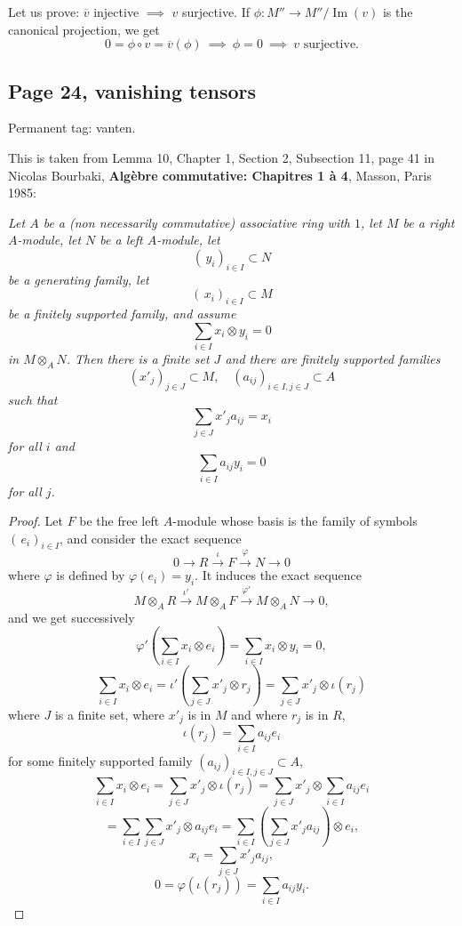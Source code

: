 \documentclass[parskip=half,fontsize=12pt]{scrartcl}%
\newcommand{\oo}{\operatorname}\newcommand{\ooo}{\operatorname*}
\begin{document}
Let us prove: $\overline v$ injective $\implies$ $v$ surjective. If $\phi:M''\to M''/\oo{Im}(v)$ is the canonical projection, we get 
$$
0=\phi\circ v=\overline v(\phi)\ \implies\ \phi=0\ \implies\ v\text{ surjective.}
$$

\subsection{Page 24, vanishing tensors}\label{vt}%

Permanent tag: vanten.

This is taken from Lemma 10, Chapter 1, Section 2, Subsection 11, page 41 in Nicolas Bourbaki, \textbf{Algèbre commutative: Chapitres 1 à 4}, Masson, Paris 1985:

\emph{Let $A$ be a (non necessarily commutative) associative ring with $1$, let $M$ be a right $A$-module, let $N$ be a left $A$-module, let 
$$
(\,y_i)_{i\in I}\subset N
$$ 
be a generating family, let 
$$
(\,x_i)_{i\in I}\subset M
$$ 
be a finitely supported family, and assume 
$$
\sum_{i\in I}x_i\otimes y_i=0
$$ 
in $M\otimes_AN$. Then there is a finite set $J$ and there are finitely supported families 
$$
(x'_j)_{j\in J}\subset M,\quad(a_{ij})_{i\in I,j\in J}\subset A
$$ 
such that 
$$
\sum_{j\in J} x'_ja_{ij}=x_i
$$ 
for all $i$ and 
$$
\sum_{i\in I}a_{ij}y_i=0
$$ 
for all $j$.}

\begin{proof} 
Let $F$ be the free left $A$-module whose basis is the family of symbols $(\,e_i)_{i\in I}$, and consider the exact sequence 
$$
0\to R\xrightarrow\iota F\xrightarrow\varphi N\to 0
$$ 
where $\varphi$ is defined by $\varphi(e_i)=y_i$. It induces the exact sequence 
$$
M\otimes_AR\xrightarrow{\iota'}M\otimes_AF\xrightarrow{\varphi'}M\otimes_AN\to 0,
$$ 
and we get successively
$$
\varphi'\left(\sum_{i\in I}x_i\otimes e_i\right)=\sum_{i\in I}x_i\otimes y_i=0,
$$ 
$$
\sum_{i\in I}x_i\otimes e_i=\iota'\left(\sum_{j\in J}x'_j\otimes r_j\right)=\sum_{j\in J}x'_j\otimes\iota(r_j)
$$ 
where $J$ is a finite set, where $x'_j$ is in $M$ and where $r_j$ is in $R$, 
$$
\iota(r_j)=\sum_{i\in I}a_{ij}e_i
$$ 
for some finitely supported family $(a_{ij})_{i\in I,j\in J}\subset A$, 
$$
\sum_{i\in I}x_i\otimes e_i=\sum_{j\in J}x'_j\otimes\iota(r_j)=\sum_{j\in J} x'_j\otimes\sum_{i\in I}a_{ij}e_i
$$
$$
=\sum_{i\in I}\sum_{j\in J} x'_j\otimes a_{ij}e_i=\sum_{i\in I}\left(\sum_{j\in J}x'_ja_{ij}\right)\otimes e_i,
$$ 
$$
x_i=\sum_{j\in J}x'_ja_{ij},
$$ 
$$
0=\varphi(\iota(r_j))=\sum_{i\in I}a_{ij}y_i.
$$ 
\end{proof}
\end{document}
